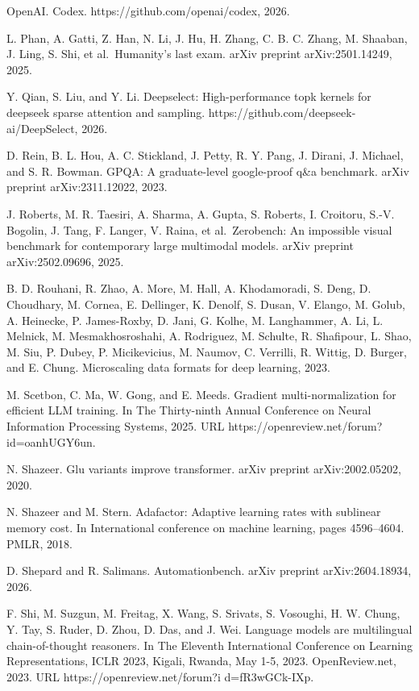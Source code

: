 OpenAI. Codex. https://github.com/openai/codex, 2026.

L. Phan, A. Gatti, Z. Han, N. Li, J. Hu, H. Zhang, C. B. C. Zhang, M.
Shaaban, J. Ling, S. Shi, et al.~Humanity's last exam. arXiv preprint
arXiv:2501.14249, 2025.

Y. Qian, S. Liu, and Y. Li. Deepselect: High-performance topk kernels
for deepseek sparse attention and sampling.
https://github.com/deepseek-ai/DeepSelect, 2026.

D. Rein, B. L. Hou, A. C. Stickland, J. Petty, R. Y. Pang, J. Dirani, J.
Michael, and S. R. Bowman. GPQA: A graduate-level google-proof q\&a
benchmark. arXiv preprint arXiv:2311.12022, 2023.

J. Roberts, M. R. Taesiri, A. Sharma, A. Gupta, S. Roberts, I. Croitoru,
S.-V. Bogolin, J. Tang, F. Langer, V. Raina, et al.~Zerobench: An
impossible visual benchmark for contemporary large multimodal models.
arXiv preprint arXiv:2502.09696, 2025.

B. D. Rouhani, R. Zhao, A. More, M. Hall, A. Khodamoradi, S. Deng, D.
Choudhary, M. Cornea, E. Dellinger, K. Denolf, S. Dusan, V. Elango, M.
Golub, A. Heinecke, P. James-Roxby, D. Jani, G. Kolhe, M. Langhammer, A.
Li, L. Melnick, M. Mesmakhosroshahi, A. Rodriguez, M. Schulte, R.
Shafipour, L. Shao, M. Siu, P. Dubey, P. Micikevicius, M. Naumov, C.
Verrilli, R. Wittig, D. Burger, and E. Chung. Microscaling data formats
for deep learning, 2023.

M. Scetbon, C. Ma, W. Gong, and E. Meeds. Gradient multi-normalization
for efficient LLM training. In The Thirty-ninth Annual Conference on
Neural Information Processing Systems, 2025. URL
https://openreview.net/forum?id=oanhUGY6un.

N. Shazeer. Glu variants improve transformer. arXiv preprint
arXiv:2002.05202, 2020.

N. Shazeer and M. Stern. Adafactor: Adaptive learning rates with
sublinear memory cost. In International conference on machine learning,
pages 4596--4604. PMLR, 2018.

D. Shepard and R. Salimans. Automationbench. arXiv preprint
arXiv:2604.18934, 2026.

F. Shi, M. Suzgun, M. Freitag, X. Wang, S. Srivats, S. Vosoughi, H. W.
Chung, Y. Tay, S. Ruder, D. Zhou, D. Das, and J. Wei. Language models
are multilingual chain-of-thought reasoners. In The Eleventh
International Conference on Learning Representations, ICLR 2023, Kigali,
Rwanda, May 1-5, 2023. OpenReview.net, 2023. URL
https://openreview.net/forum?i d=fR3wGCk-IXp.


